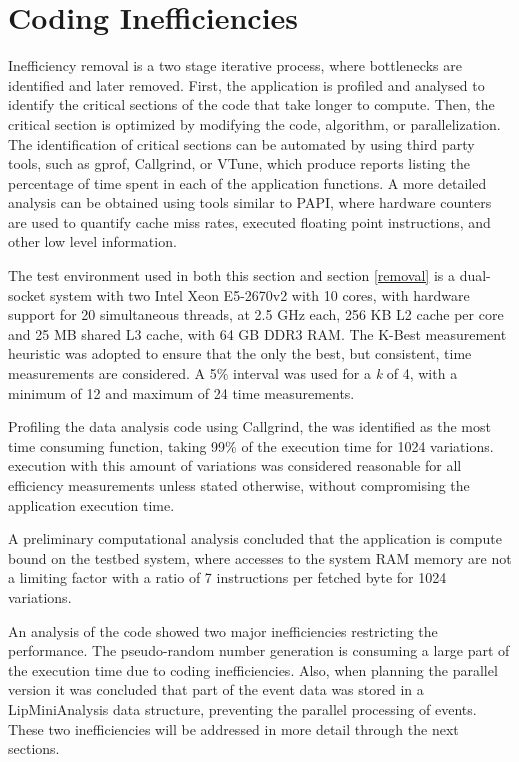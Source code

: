 \section{Coding Inefficiencies}
\label{identification}

Inefficiency removal is a two stage iterative process, where bottlenecks are identified and later removed. First, the application is profiled and analysed to identify the critical sections of the code that take longer to compute. Then, the critical section is optimized by modifying the code, algorithm, or parallelization. The identification of critical sections can be automated by using third party tools, such as gprof, Callgrind, or VTune, which produce reports listing the percentage of time spent in each of the application functions. A more detailed analysis can be obtained using tools similar to PAPI, where hardware counters are used to quantify cache miss rates, executed floating point instructions, and other low level information.

The test environment used in both this section and section \ref{removal} is a dual-socket system with two Intel Xeon E5-2670v2 with 10 cores, with hardware support for 20 simultaneous threads, at 2.5 GHz each, 256 KB L2 cache per core and 25 MB shared L3 cache, with 64 GB DDR3 RAM. The K-Best measurement heuristic was adopted to ensure that the only the best, but consistent, time measurements are considered. A 5\% interval was used for a \textit{k} of 4, with a minimum of 12 and maximum of 24 time measurements.

Profiling the data analysis code using Callgrind, the \ttDilepKinFit was identified as the most time consuming function, taking 99\% of the execution time for 1024 variations. \tth execution with this amount of variations was considered reasonable for all efficiency measurements unless stated otherwise, without compromising the application execution time.

A preliminary computational analysis concluded that the application is compute bound on the testbed system, where accesses to the system RAM memory are not a limiting factor with a ratio of 7 instructions per fetched byte for 1024 variations.

An analysis of the code showed two major inefficiencies restricting the performance. The pseudo-random number generation is consuming a large part of the \ttDilepKinFit execution time due to coding inefficiencies. Also, when planning the parallel version it was concluded that part of the event data was stored in a LipMiniAnalysis data structure, preventing the parallel processing of events. These two inefficiencies will be addressed in more detail through the next sections.

